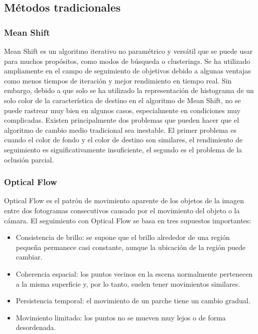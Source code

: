 \subsection{Métodos tradicionales}
\label{subsec:metodos-tradicionales-seguimiento}

\subsubsection*{Mean Shift}
\label{subsubsec:mean-shift}

Mean Shift es un algoritmo iterativo no paramétrico y versátil que se puede usar para muchos propósitos, como modos de búsqueda o clusterings. Se ha utilizado ampliamente en el campo de seguimiento de objetivos debido a algunas ventajas como menos tiempos de iteración y mejor rendimiento en tiempo real. Sin embargo, debido a que solo se ha utilizado la representación de histograma de un solo color de la característica de destino en el algoritmo de Mean Shift, no se puede rastrear muy bien en algunos casos, especialmente en condiciones muy complicadas. Existen principalmente dos problemas que pueden hacer que el algoritmo de cambio medio tradicional sea inestable. El primer problema es cuando el color de fondo y el color de destino son similares, el rendimiento de seguimiento es significativamente insuficiente, el segundo es el problema de la oclusión parcial.

\subsubsection*{Optical Flow}
\label{subsubsec:optical-flow}

Optical Flow es el patrón de movimiento aparente de los objetos de la imagen entre dos fotogramas consecutivos causado por el movimiento del objeto o la cámara. El seguimiento con Optical Flow se basa en tres supuestos importantes:

\begin{itemize}
    \item Consistencia de brillo: se supone que el brillo alrededor de una región pequeña permanece casi constante, aunque la ubicación de la región puede cambiar.
    \item Coherencia espacial: los puntos vecinos en la escena normalmente pertenecen a la misma superficie y, por lo tanto, suelen tener movimientos similares.
    \item Persistencia temporal: el movimiento de un parche tiene un cambio gradual.
    \item Movimiento limitado: los puntos no se mueven muy lejos o de forma desordenada.
\end{itemize}

